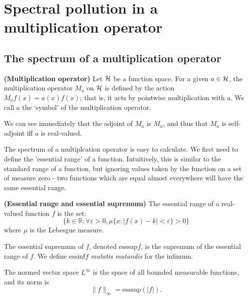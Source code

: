 \documentclass[../main.tex]{subfiles}
\begin{document}
\section{Spectral pollution in a multiplication operator}
\subsection{The spectrum of a multiplication operator}
\begin{definition}{\textbf{(Multiplication operator)}
}
Let $\mathcal{H}$ be a function space. For a given $a \in \mathcal{H}$, the
multiplication operator $M_a$ on $\mathcal{H}$ is defined by the action
$M_af(x) = a(x)f(x)$; that is, it acts by pointwise multiplication with
$a$. We call $a$ the `symbol' of the multiplication operator.
\end{definition}

We can see immediately that the adjoint of $M_a$ is $M_{\overline{a}}$, and thus
that $M_a$ is self-adjoint iff $a$ is real-valued.

The spectrum of a multiplcation operator is easy to calculate. We first
need to define the 'essential range' of a function. Intuitively, this is
similar to the standard range of a function, but ignoring values taken by
the function on a set of measure zero - two functions which are equal
almost everywhere will have the same essential range.

\begin{definition}{\textbf{(Essential range and essential supremum)}}
\label{defn:essential-range}
The essential range of a real-valued function $f$ is the set:
 $$\{k \in \mathbb{R} : \forall \varepsilon > 0, \mu\{x : |f(x) - k| < \varepsilon\} > 0\}$$
where $\mu$ is the Lebesgue measure.
  
The essential supremum of $f$, denoted $\mathrm{esssup}f$, is the supremum of
the essential range of $f$. We define $\mathrm{essinf}f$ \emph{mutatis
mutandis} for the infimum.
\end{definition}

The normed vector space $L^\infty$ is the space of all bounded measurable
functions, and its norm is
 $$\|f\|_\infty = \text{esssup}(|f|).$$
\end{document}
